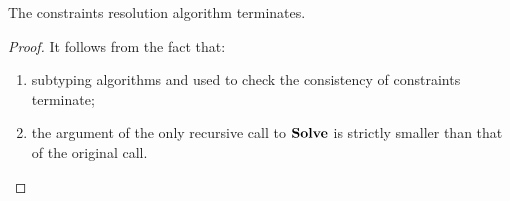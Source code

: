 \begin{theorem}%
\label{thm:solvectr-terminates}
    The constraints resolution algorithm \solvectrdflt terminates.
\end{theorem}
\begin{proof}
    It follows from the fact that:
    \begin{enumerate}
        \item subtyping algorithms  and 
             used to check the consistency of 
            constraints terminate;
        \item the argument \UEnv of the only recursive call to $\operatorname{\mathbf{Solve}}$
            is strictly smaller than that of the original call.
    \end{enumerate} 
\end{proof}


